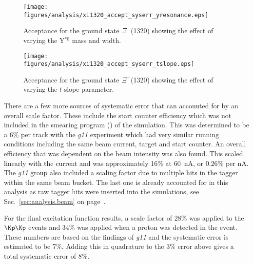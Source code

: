 \begin{figure}\centering
    \texttt{[image: \\figures/analysis/xi1320\_accept\_syserr\_yresonance.eps]}
    \caption[Acceptance Systematic Error, Y$^{*0}$ Properties]{\label{fig:accept.syserr.a}Acceptance for the ground state $\Xi^-$(1320) showing the effect of varying the Y$^{*0}$ mass and width.}
\end{figure}

\begin{figure}\centering
    \texttt{[image: \\figures/analysis/xi1320\_accept\_syserr\_tslope.eps]}
    \caption[Acceptance Systematic Error, $t$-slope]{\label{fig:accept.syserr.b}Acceptance for the ground state $\Xi^-$(1320) showing the effect of varying the $t$-slope parameter.}
\end{figure}

There are a few more sources of systematic error that can accounted for by an overall scale factor. These include the start counter efficiency which was not included in the smearing program () of the simulation. This was determined to be a 6\% per track with the \emph{g11}\cite{clas.thesis.williams} experiment which had very similar running conditions including the same beam current, target and start counter. An overall efficiency that was dependent on the beam intensity was also found. This scaled linearly with the current and was approximately 16\% at 60~nA, or 0.26\% per nA. The \emph{g11} group also included a scaling factor due to multiple hits in the tagger within the same beam bucket. The last one is already accounted for in this analysis as raw tagger hits were inserted into the simulations, see Sec.~\ref{sec:analysis.beam} on page~\pageref{sec:analysis.beam}.

For the final excitation function results, a scale factor of 28\% was applied to the $\Kp\Kp$ events and 34\% was applied when a proton was detected in the event. These numbers are based on the findings of \emph{g11} and the systematic error is estimated to be 7\%. Adding this in quadrature to the 3\% error above gives a total systematic error of 8\%.




